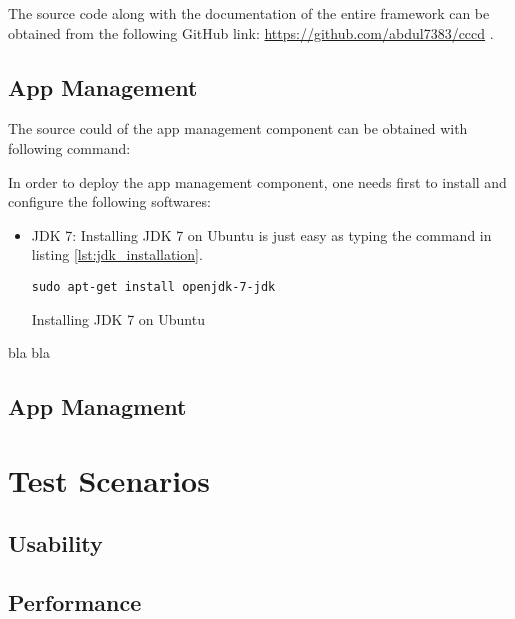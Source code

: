 The source code along with the documentation of the entire framework can be obtained from the following GitHub link: \url{https://github.com/abdul7383/cccd} .

\subsection{App Management\label{sec:eval_te_en_app}}
The source could of the app management component can be obtained with following command:

In order to deploy the app management component, one needs first to install and configure the following softwares:

\begin{itemize}
\item{\ac{JDK} 7:} Installing  \ac{JDK} 7 on Ubuntu is just easy as typing the command in listing \ref{lst:jdk_installation}.
\begin{code}
\begin{verbatim}
sudo apt-get install openjdk-7-jdk
\end{verbatim}
\caption{Installing \ac{JDK} 7 on Ubuntu}
\label{lst:jdk_installation}
\end{code}
\end{itemize}
bla bla

\subsection{App Managment\label{sec:eval_te_en_mongo}}
\section{Test Scenarios\label{sec:eval__te_sc}}
	\subsection{Usability\label{seq:eval_usab}}
	
	\subsection{Performance\label{seq:eval_perf}}
